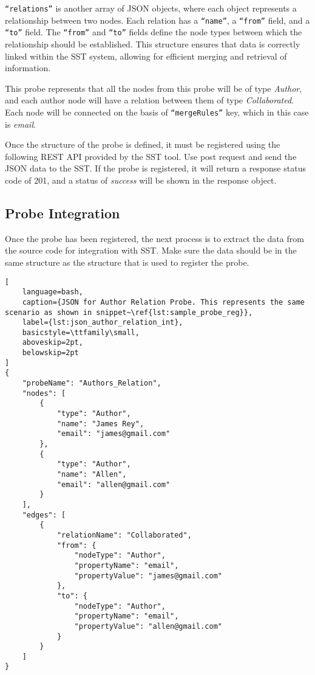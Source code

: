 \texttt{``relations''} is another array of JSON objects, where each object represents a relationship between two nodes. Each relation has a \texttt{``name''}, a \texttt{``from''} field, and a \texttt{``to''} field. The \texttt{``from''} and \texttt{``to''} fields define the node types between which the relationship should be established. This structure ensures that data is correctly linked within the SST system, allowing for efficient merging and retrieval of information.

This probe represents that all the nodes from this probe will be of type \textit{Author}, and each author node will have a relation between them of type \textit{Collaborated}. Each node will be connected on the basis of \texttt{``mergeRules''} key, which in this case is \textit{email}.

Once the structure of the probe is defined, it must be registered using the following REST API provided by the SST tool. Use post request and send the JSON data to the SST. If the probe is registered, it will return a response status code of 201, and a status of \textit{success} will be shown in the response object.

\subsection{Probe Integration}

Once the probe has been registered, the next process is to extract the data from the source code for integration with SST. Make sure the data should be in the same structure as the structure that is used to register the probe.
\newpage
\begin{lstlisting}[
    language=bash, 
    caption={JSON for Author Relation Probe. This represents the same scenario as shown in snippet~\ref{lst:sample_probe_reg}}, 
    label={lst:json_author_relation_int},
    basicstyle=\ttfamily\small,
    aboveskip=2pt,
    belowskip=2pt
]
{
    "probeName": "Authors_Relation",
    "nodes": [
        {
            "type": "Author",
            "name": "James Rey",
            "email": "james@gmail.com"
        },
        {
            "type": "Author",
            "name": "Allen",
            "email": "allen@gmail.com"
        }
    ],
    "edges": [
        {
            "relationName": "Collaborated",
            "from": {
                "nodeType": "Author",
                "propertyName": "email",
                "propertyValue": "james@gmail.com"
            },
            "to": {
                "nodeType": "Author",
                "propertyName": "email",
                "propertyValue": "allen@gmail.com"
            }
        }
    ]
}
\end{lstlisting}
